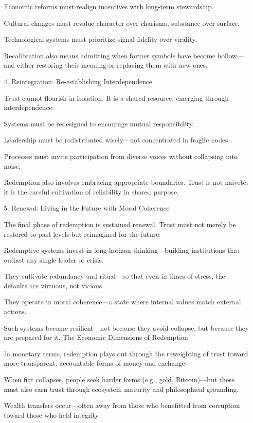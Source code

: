 \documentclass[11pt,oneside]{book}
\begin{document}
    Economic reforms must realign incentives with long-term stewardship.

    Cultural changes must revalue character over charisma, substance over surface.

    Technological systems must prioritize signal fidelity over virality.

Recalibration also means admitting when former symbols have become hollow—and either restoring their meaning or replacing them with new ones.

4. Reintegration: Re-establishing Interdependence


Trust cannot flourish in isolation. It is a shared resource, emerging through interdependence:

    Systems must be redesigned to encourage mutual responsibility.

    Leadership must be redistributed wisely—not concentrated in fragile nodes.

    Processes must invite participation from diverse voices without collapsing into noise.

Redemption also involves embracing appropriate boundaries. Trust is not naiveté; it is the careful cultivation of reliability in shared purpose.

5. Renewal: Living in the Future with Moral Coherence


The final phase of redemption is sustained renewal. Trust must not merely be restored to past levels but reimagined for the future:

    Redemptive systems invest in long-horizon thinking—building institutions that outlast any single leader or crisis.

    They cultivate redundancy and ritual—so that even in times of stress, the defaults are virtuous, not vicious.

    They operate in moral coherence—a state where internal values match external actions.

Such systems become resilient—not because they avoid collapse, but because they are prepared for it.
The Economic Dimensions of Redemption

In monetary terms, redemption plays out through the reweighting of trust toward more transparent, accountable forms of money and exchange:

    When fiat collapses, people seek harder forms (e.g., gold, Bitcoin)—but these must also earn trust through ecosystem maturity and philosophical grounding.

    Wealth transfers occur—often away from those who benefitted from corruption toward those who held integrity.
\end{document}

